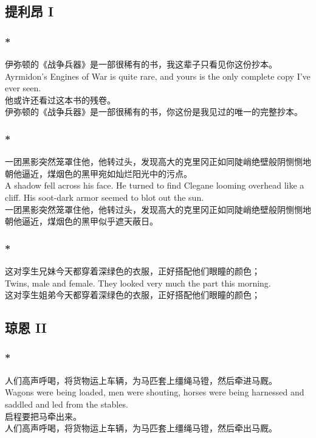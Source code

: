 \documentclass[12pt,a4paper]{article}
\newcommand{\h}[1]{{\color{red}#1}\\}
\newcommand{\la}[1]{{\color{blue}#1}\\}
\begin{document}
\subsection{提利昂 I}
\subsubsection{\color{red}*}\la{
伊弥顿的《战争兵器》是一部很稀有的书，我这辈子只看见你这份抄本。\\
Ayrmidon's Engines of War is quite rare, and yours is the only complete copy I've ever seen.}\h{
他或许还看过这本书的残卷。}
伊弥顿的《战争兵器》是一部很稀有的书，你这份是我见过的唯一的完整抄本。
	
\subsubsection{\color{red}*}\la{
	一团黑影突然笼罩住他，他转过头，发现高大的克里冈正如同陡峭绝壁般阴恻恻地朝他逼近，煤烟色的黑甲宛如灿烂阳光中的污点。\\
	A shadow fell across his face. He turned to find Clegane looming overhead like a cliff. His soot-dark armor seemed to blot out the sun.}
一团黑影突然笼罩住他，他转过头，发现高大的克里冈正如同陡峭绝壁般阴恻恻地朝他逼近，煤烟色的黑甲似乎遮天蔽日。	
	
\subsubsection{\color{red}*}\la{
这对孪生兄妹今天都穿着深绿色的衣服，正好搭配他们眼瞳的颜色；\\
Twins, male and female. They looked very much the part this morning.}
这对孪生姐弟今天都穿着深绿色的衣服，正好搭配他们眼瞳的颜色；
		
\subsection{琼恩 II}	
\subsubsection{\color{red}*}\la{
人们高声呼喝，将货物运上车辆，为马匹套上缰绳马镫，然后牵进马厩。\\
Wagons were being loaded, men were shouting, horses were being harnessed and saddled and led from the stables.}\h{
启程要把马牵出来。}
人们高声呼喝，将货物运上车辆，为马匹套上缰绳马镫，然后牵出马厩。
			
			
\end{document}
